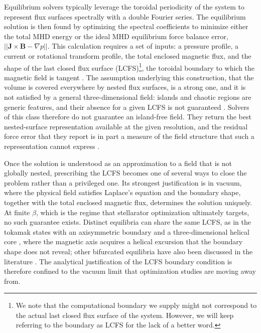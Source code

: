 \documentclass{jpp}
\begin{document}
Equilibrium solvers typically leverage the toroidal periodicity of the system to represent flux surfaces spectrally with a double Fourier series. The equilibrium solution is then found by optimizing the spectral coefficients to minimize either the total MHD energy or the ideal MHD equilibrium force balance error, $||\mathbf{J}\times\mathbf{B}-\nabla p||$. This calculation requires a set of inputs: a pressure profile, a current or rotational transform profile, the total enclosed magnetic flux, and the shape of the last closed flux surface (LCFS)\footnote{We note that the computational boundary we supply might not correspond to the actual last closed flux surface of the system. However, we will keep referring to the boundary as LCFS for the lack of a better word.}, the toroidal boundary to which the magnetic field is tangent \citep{kruskalEquilibriumMagneticallyConfined1958}. The assumption underlying this construction, that the volume is covered everywhere by nested flux surfaces, is a strong one, and it is not satisfied by a general three-dimensional field: islands and chaotic regions are generic features, and their absence for a given LCFS is not guaranteed \citep{grad_toroidal_1967, garabedian_computational_2003}. Solvers of this class therefore do not guarantee an island-free field. They return the best nested-surface representation available at the given resolution, and the residual force error that they report is in part a measure of the field structure that such a representation cannot express \citep{lazerson_verification_2016}.

Once the solution is understood as an approximation to a field that is not globally nested, prescribing the LCFS becomes one of several ways to close the problem rather than a privileged one. Its strongest justification is in vacuum, where the physical field satisfies Laplace's equation and the boundary shape, together with the total enclosed magnetic flux, determines the solution uniquely. At finite $\beta$, which is the regime that stellarator optimization ultimately targets, no such guarantee exists. Distinct equilibria can share the same LCFS, as in the tokamak states with an axisymmetric boundary and a three-dimensional helical core \citep{cooperTokamakMagnetohydrodynamicEquilibrium2010, paniciDeflationTechniquesStellarator2026}, where the magnetic axis acquires a helical excursion that the boundary shape does not reveal; other bifurcated equilibria have also been discussed in the literature \citep{garabedian_computational_2003, ilgisonisBifurcationEquilibriumCurrentcarrying2004, garabedianBifurcatedEquilibriaMagnetic2006}. The analytical justification of the LCFS boundary condition is therefore confined to the vacuum limit that optimization studies are moving away from.
\end{document}
